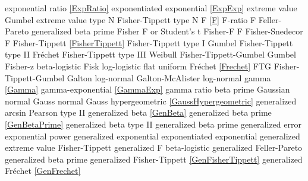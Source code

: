 exponential ratio				\dotfill	\eqref{ExpRatio}					\ncite	%
exponentiated exponential		\dotfill	\eqref{ExpExp}						\ncite	%
extreme value					\dotfill	Gumbel 							\ncite
extreme value type N 			\dotfill	Fisher-Tippett type N 				\ncite	%
%
F								\dotfill	\eqref{F} 							\ncite	%
F-ratio							\dotfill	F								\ncite	%
Feller-Pareto					\dotfill	generalized beta prime 				\ncite	%
Fisher							\dotfill	F or Student's t 					\ncite	%
Fisher-F 						\dotfill	F 								\ncite	%
Fisher-Snedecor 				\dotfill	F 								\ncite	%
Fisher-Tippett					\dotfill	\eqref{FisherTippett} 					\ncite	%
Fisher-Tippett type I			\dotfill	Gumbel 							\ncite	%
Fisher-Tippett type II			\dotfill	Fr\'{e}chet  						\ncite	%
Fisher-Tippett type III			\dotfill	Weibull 							\ncite	%
Fisher-Tippett-Gumbel			\dotfill	Gumbel  							\ncite	%
Fisher-z						\dotfill	beta-logistic						\ncite	%
Fisk							\dotfill	log-logistic						\ncite 	%
flat 							\dotfill	uniform 							\ncite	%
Fr\'{e}chet 					\dotfill	\eqref{Frechet} 						\ncite	%
FTG								\dotfill	Fisher-Tippett-Gumbel 				\ncite	%
%
Galton							\dotfill	log-normal 						\ncite	%
Galton-McAlister				\dotfill	log-normal 						\ncite	%
gamma							\dotfill	\eqref{Gamma} 					\ncite	%
gamma-exponential				\dotfill	\eqref{GammaExp}					\ncite	%
gamma ratio						\dotfill	beta prime						\ncite	%
Gaussian 						\dotfill	normal 							\ncite	%
Gauss 							\dotfill	normal 							\ncite	%
Gauss hypergeometric			\dotfill	\eqref{GaussHypergeometric}			\ncite
generalized arcsin				\dotfill	Pearson type II 					   	%
generalized beta 				\dotfill	\eqref{GenBeta} 					\ncite	%
generalized beta prime 			\dotfill	\eqref{GenBetaPrime} 				 %
generalized beta type II		\dotfill	generalized beta prime				
generalized error				\dotfill	exponential power					\ncite
generalized exponential			\dotfill	exponentiated exponential 			    %
generalized extreme value		\dotfill	Fisher-Tippett						\ncite	%
generalized F					\dotfill	beta-logistic 						\ncite	%
generalized Feller-Pareto		\dotfill	generalized beta prime				
generalized Fisher-Tippett		\dotfill	\eqref{GenFisherTippett} 				\ncite	%
generalized Fr\'{e}chet 		\dotfill	\eqref{GenFrechet} 					\ncite	%
